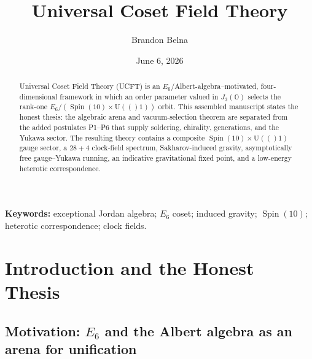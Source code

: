 \documentclass[11pt]{article}
\title{Universal Coset Field Theory}
\author{Brandon Belna}
\date{June 6, 2026}
\theoremstyle{plain}
\theoremstyle{definition}
\theoremstyle{remark}
\newcommand{\U}[1]{\mathrm{U}(#1)}
\newcommand{\Spin}{\operatorname{Spin}}
\begin{document}
\maketitle

\begin{abstract}
Universal Coset Field Theory (UCFT) is an $E_6$/Albert-algebra--motivated, four-dimensional framework in which an order parameter valued in $J_3(\mathbb O)$ selects the rank-one $E_6/(\Spin(10)\times\U(1))$ orbit. This assembled manuscript states the honest thesis: the algebraic arena and vacuum-selection theorem are separated from the added postulates P1--P6 that supply soldering, chirality, generations, and the Yukawa sector. The resulting theory contains a composite $\Spin(10)\times\U(1)$ gauge sector, a $28+4$ clock-field spectrum, Sakharov-induced gravity, asymptotically free gauge--Yukawa running, an indicative gravitational fixed point, and a low-energy heterotic correspondence.
\end{abstract}

\noindent\textbf{Keywords:} exceptional Jordan algebra; $E_6$ coset; induced gravity; $\Spin(10)$; heterotic correspondence; clock fields.

\tableofcontents
\clearpage

\section{Introduction and the Honest Thesis}
\label{sec:intro:main}

\subsection{Motivation: \texorpdfstring{$E_6$}{E6} and the Albert algebra as an arena for unification}
\label{sec:intro:motivation}
\end{document}
